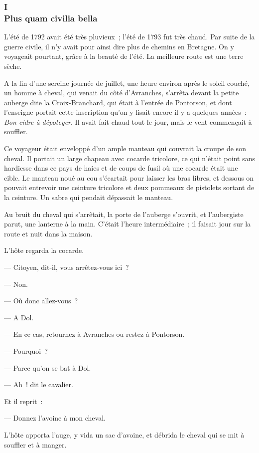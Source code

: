 \documentclass[french,twoside]{book} %
\begin{document}
\subsubsection[{I. Plus quam civilia bella}]{I \\
Plus quam civilia bella}
\label{p3l2c1}
\noindent L’été de 1792 avait été très pluvieux ; l’été de 1793 fut très chaud. Par suite de la guerre civile, il n’y avait pour ainsi dire plus de chemins en Bretagne. On y voyageait pourtant, grâce à la beauté de l’été. La meilleure route est une terre sèche.\par
A la fin d’une sereine journée de juillet, une heure environ après le soleil couché, un homme à cheval, qui venait du côté d’Avranches, s’arrêta devant la petite auberge dite la Croix-Branchard, qui était à l’entrée de Pontorson, et dont l’enseigne portait cette inscription qu’on y lisait encore il y a quelques années : \emph{Bon cidre à dépoteyer}. Il avait fait chaud tout le jour, mais le vent commençait à souffler.\par
Ce voyageur était enveloppé d’un ample manteau qui couvrait la croupe de son cheval. Il portait un  large chapeau avec cocarde tricolore, ce qui n’était point sans hardiesse dans ce pays de haies et de coups de fusil où une cocarde était une cible. Le manteau noué au cou s’écartait pour laisser les bras libres, et dessous on pouvait entrevoir une ceinture tricolore et deux pommeaux de pistolets sortant de la ceinture. Un sabre qui pendait dépassait le manteau.\par
Au bruit du cheval qui s’arrêtait, la porte de l’auberge s’ouvrit, et l’aubergiste parut, une lanterne à la main. C’était l’heure intermédiaire ; il faisait jour sur la route et nuit dans la maison.\par
L’hôte regarda la cocarde.\par
— Citoyen, dit-il, vous arrêtez-vous ici ?\par
— Non.\par
— Où donc allez-vous ?\par
— A Dol.\par
— En ce cas, retournez à Avranches ou restez à Pontorson.\par
— Pourquoi ?\par
— Parce qu’on se bat à Dol.\par
— Ah ! dit le cavalier.\par
Et il reprit :\par
— Donnez l’avoine à mon cheval.\par
L’hôte apporta l’auge, y vida un sac d’avoine, et débrida le cheval qui se mit à souffler et à manger.\par
\end{document}
